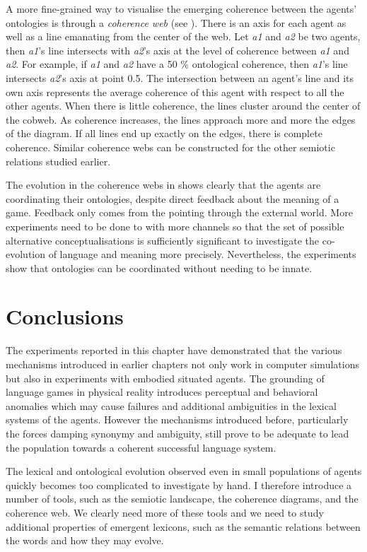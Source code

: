 A more fine-grained way to visualise the emerging
coherence between the agents' ontologies is 
through a {\itshape coherence web} (see ). 
There is an axis for each agent as well as
a line emanating from the center of the web.
Let \emph{a1} and \emph{a2} be two 
agents, then \emph{a1}'s line intersects with \emph{a2}'s axis at the 
level of coherence between \emph{a1} and \emph{a2}. For example, if \emph{a1}
and \emph{a2} have a 50 \% ontological coherence, then \emph{a1}'s
line intersects \emph{a2}'s axis at point 0.5. The intersection between 
an agent's line and its own axis represents the average 
coherence of this agent with respect to all the other
agents. When there is little 
coherence, the lines cluster around the center of the cobweb. 
As coherence increases, the lines approach more and more the edges
of the diagram. If all lines end up exactly
on the edges, there is complete coherence. Similar coherence
webs can be constructed for the other semiotic 
relations studied earlier.  

The evolution in the coherence webs in  shows clearly that the agents are 
coordinating their ontologies, despite direct feedback 
about the meaning of a game. Feedback only comes from 
the pointing through the external world. More experiments
need to be done to with more channels so that the 
set of possible alternative conceptualisations is 
sufficiently significant to investigate the co-evolution 
of language and meaning more precisely. Nevertheless, 
the experiments show that ontologies can be coordinated
without needing to be innate. 

\section{Conclusions} \enlargethispage{1\baselineskip}

The experiments reported in this chapter have
demonstrated that 
the various mechanisms introduced in earlier chapters
not only work in computer simulations but also in 
experiments with embodied situated agents. 
The grounding of language games in physical 
reality introduces perceptual and behavioral anomalies 
which may cause failures and additional ambiguities
in the lexical systems of the agents. However the 
mechanisms introduced before, particularly the 
forces damping synonymy and ambiguity, still prove to 
be adequate to lead the population towards a 
coherent successful language system. 

The lexical and ontological evolution observed even 
in small populations of agents quickly becomes 
too complicated to investigate by hand. I therefore
introduce a number of tools, such as the semiotic
landscape, the coherence diagrams, and the coherence
web. We clearly need more of these tools and we 
need to study additional properties of emergent 
lexicons, such as the semantic relations between 
the words and how they may evolve. 

